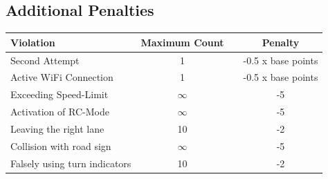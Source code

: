 
\strut
\subsection*{Additional Penalties}
\label{obstacle_additional_penalties}

\begin{table}[H]
	\begin{tabular}{@{}lccc@{}}
		\toprule
		\textbf{Violation}            & \textbf{Maximum Count} &  & \textbf{Penalty}   \\
		\midrule
		Second Attempt                & 1                      &  & -0.5 x base points \\
		Active WiFi Connection        & 1                      &  & -0.5 x base points \\
		Exceeding Speed-Limit         & $\infty$               &  & -5                 \\
		Activation of RC-Mode         & $\infty$               &  & -5                 \\
		Leaving the right lane        & 10                     &  & -2                 \\
		Collision with road sign      & $\infty$               &  & -5                 \\
		Falsely using turn indicators & 10                     &  & -2                 \\
		\bottomrule
	\end{tabular}
\end{table}

\clearpage
